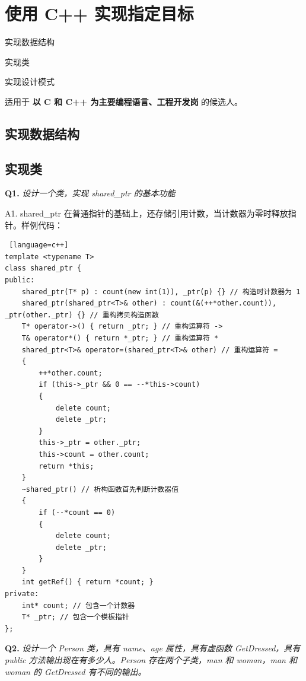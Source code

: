\documentclass[cn,10pt,math=newtx,citestyle=gb7714-2015,bibstyle=gb7714-2015]{elegantbook}
\begin{document}
\newpage


\section{使用 C++ 实现指定目标}

\begin{introduction}
\item 实现数据结构
\item 实现类
\item 实现设计模式
\end{introduction}

适用于 \textbf{以 C 和 C++ 为主要编程语言、工程开发岗} 的候选人。

\subsection{实现数据结构}

\subsection{实现类}

\textbf{Q1.} \textit{设计一个类，实现 shared\_ptr 的基本功能}

A1. shared\_ptr 在普通指针的基础上，还存储引用计数，当计数器为零时释放指针。样例代码：

\begin{lstlisting} [language=c++]
template <typename T>
class shared_ptr {
public:
    shared_ptr(T* p) : count(new int(1)), _ptr(p) {} // 构造时计数器为 1
    shared_ptr(shared_ptr<T>& other) : count(&(++*other.count)), _ptr(other._ptr) {} // 重构拷贝构造函数
    T* operator->() { return _ptr; } // 重构运算符 ->
    T& operator*() { return *_ptr; } // 重构运算符 *
    shared_ptr<T>& operator=(shared_ptr<T>& other) // 重构运算符 =
    {
        ++*other.count;
        if (this->_ptr && 0 == --*this->count)
        {
            delete count;
            delete _ptr;
        }
        this->_ptr = other._ptr;
        this->count = other.count;
        return *this;
    }
    ~shared_ptr() // 析构函数首先判断计数器值
    {
        if (--*count == 0)
        {
            delete count;
            delete _ptr;
        }
    }
    int getRef() { return *count; }
private:
    int* count; // 包含一个计数器
    T* _ptr; // 包含一个模板指针
};
\end{lstlisting}

\textbf{Q2.} \textit{设计一个 Person 类，具有 name、age 属性，具有虚函数 GetDressed，具有 public 方法输出现在有多少人。Person 存在两个子类，man 和 woman，man 和 woman 的 GetDressed 有不同的输出。}
\end{document}
